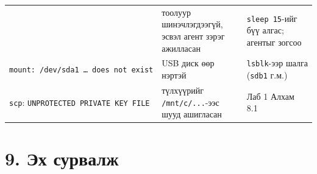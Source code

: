 \begin{longtable}[]{@{}lll@{}}
\begin{minipage}[t]{0.30\columnwidth}
\end{minipage} & \begin{minipage}[t]{0.30\columnwidth}\raggedright
тоолуур шинэчлэгдээгүй, эсвэл агент зэрэг ажилласан\strut
\end{minipage} & \begin{minipage}[t]{0.30\columnwidth}\raggedright
\texttt{sleep\ 15}-ийг бүү алгас; агентыг зогсоо\strut
\end{minipage}\tabularnewline
\begin{minipage}[t]{0.30\columnwidth}\raggedright
\texttt{mount:\allowbreak{}\ /\allowbreak{}dev/\allowbreak{}sda1\ \ldots{}\ does\ not\ exist}\strut
\end{minipage} & \begin{minipage}[t]{0.30\columnwidth}\raggedright
USB диск өөр нэртэй\strut
\end{minipage} & \begin{minipage}[t]{0.30\columnwidth}\raggedright
\texttt{lsblk}-ээр шалга (\texttt{sdb1} г.м.)\strut
\end{minipage}\tabularnewline
\begin{minipage}[t]{0.30\columnwidth}\raggedright
\texttt{scp}: \texttt{UNPROTECTED\ PRIVATE\ KEY\ FILE}\strut
\end{minipage} & \begin{minipage}[t]{0.30\columnwidth}\raggedright
түлхүүрийг \texttt{/mnt/c/...}-ээс шууд ашигласан\strut
\end{minipage} & \begin{minipage}[t]{0.30\columnwidth}\raggedright
Лаб 1 Алхам 8.1\strut
\end{minipage}\tabularnewline
\bottomrule
\end{longtable}\endgroup

\hypertarget{ux44dux445-ux441ux443ux440ux432ux430ux43bux436}{%
\section{9. Эх сурвалж}\label{ux44dux445-ux441ux443ux440ux432ux430ux43bux436}}

